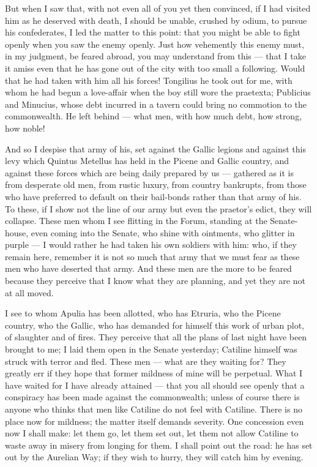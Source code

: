 But when I saw that, with not even all of you yet then convinced, if I had visited him as he deserved with death, I should be unable, crushed by odium, to pursue his confederates, I led the matter to this point: that you might be able to fight openly when you saw the enemy openly. Just how vehemently this enemy must, in my judgment, be feared abroad, you may understand from this --- that I take it amiss even that he has gone out of the city with too small a following. Would that he had taken with him all his forces! Tongilius he took out for me, with whom he had begun a love-affair when the boy still wore the praetexta; Publicius and Minucius, whose debt incurred in a tavern could bring no commotion to the commonwealth. He left behind --- what men, with how much debt, how strong, how noble!

 And so I despise that army of his, set against the Gallic legions and against this levy which Quintus Metellus has held in the Picene and Gallic country, and against these forces which are being daily prepared by us --- gathered as it is from desperate old men, from rustic luxury, from country bankrupts, from those who have preferred to default on their bail-bonds rather than that army of his. To these, if I show not the line of our army but even the praetor's edict, they will collapse. These men whom I see flitting in the Forum, standing at the Senate-house, even coming into the Senate, who shine with ointments, who glitter in purple --- I would rather he had taken his own soldiers with him: who, if they remain here, remember it is not so much that army that we must fear as these men who have deserted that army. And these men are the more to be feared because they perceive that I know what they are planning, and yet they are not at all moved.

 I see to whom Apulia has been allotted, who has Etruria, who the Picene country, who the Gallic, who has demanded for himself this work of urban plot, of slaughter and of fires. They perceive that all the plans of last night have been brought to me; I laid them open in the Senate yesterday; Catiline himself was struck with terror and fled. These men --- what are they waiting for? They greatly err if they hope that former mildness of mine will be perpetual. What I have waited for I have already attained --- that you all should see openly that a conspiracy has been made against the commonwealth; unless of course there is anyone who thinks that men like Catiline do not feel with Catiline. There is no place now for mildness; the matter itself demands severity. One concession even now I shall make: let them go, let them set out, let them not allow Catiline to waste away in misery from longing for them. I shall point out the road: he has set out by the Aurelian Way; if they wish to hurry, they will catch him by evening.

